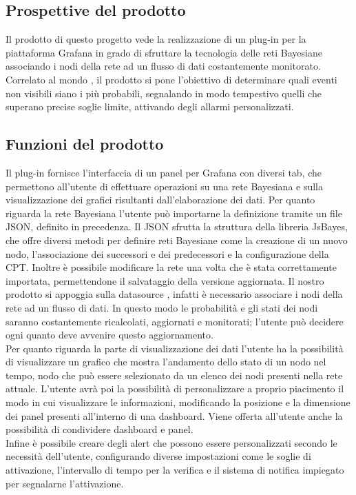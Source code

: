 
\subsection{Prospettive del prodotto}
Il prodotto di questo progetto vede la realizzazione di un plug-in per la piattaforma Grafana in grado di sfruttare la tecnologia delle reti Bayesiane associando i nodi della rete ad un flusso di dati costantemente monitorato. Correlato al mondo , il prodotto si pone l'obiettivo di determinare quali eventi non visibili siano i più probabili, segnalando in modo tempestivo quelli che superano precise soglie limite, attivando degli allarmi personalizzati. 

\subsection{Funzioni del prodotto}
Il plug-in fornisce l'interfaccia di un panel per Grafana con diversi tab, che permettono all'utente di effettuare operazioni su una rete Bayesiana e sulla visualizzazione dei grafici risultanti dall'elaborazione dei dati. Per quanto riguarda la rete Bayesiana l'utente può importarne la definizione tramite un file JSON, definito in precedenza. Il JSON sfrutta la struttura della libreria JsBayes, che offre diversi metodi per definire reti Bayesiane come la creazione di un nuovo nodo, l'associazione dei successori e dei predecessori e la configurazione della CPT. Inoltre è possibile modificare la rete una volta che è stata correttamente importata, permettendone il salvataggio della versione aggiornata. Il nostro prodotto si appoggia sulla datasource , infatti è necessario associare i nodi della rete ad un flusso di dati. In questo modo le probabilità e gli stati dei nodi saranno costantemente ricalcolati, aggiornati e monitorati; l'utente può decidere ogni quanto deve avvenire questo aggiornamento. \\
Per quanto riguarda la parte di visualizzazione dei dati l'utente ha la possibilità di visualizzare un grafico che mostra l'andamento dello stato di un nodo nel tempo, nodo che può essere selezionato da un elenco dei nodi presenti nella rete attuale. L'utente avrà poi la possibilità di personalizzare a proprio piacimento il modo in cui visualizzare le informazioni, modificando la posizione e la dimensione dei panel presenti all'interno di una dashboard. 
Viene offerta all'utente anche la possibilità di condividere dashboard e panel. \\
Infine è possibile creare degli alert che possono essere personalizzati secondo le necessità dell'utente, configurando diverse impostazioni come le soglie di attivazione, l'intervallo di tempo per la verifica e il sistema di notifica impiegato per segnalarne l'attivazione.


